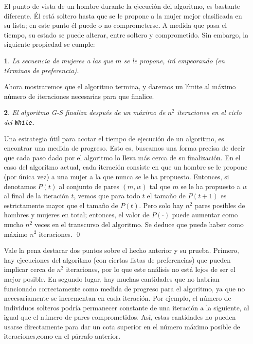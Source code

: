 \documentclass[a4paper, 12pt]{book}
\theoremstyle{dotless}
\newtheorem{theorem}{}[section]
\renewenvironment{proof}{\vspace{12pt}{\noindent\bfseries Demostración.}}{\qed\vspace{12pt}}
\begin{document}
El punto de vista de un hombre durante la ejecución del algoritmo, es bastante diferente. Él está soltero hasta que se le propone a la mujer mejor clasificada en su lista; en este punto él puede o no comprometerse. A medida que pasa el tiempo, su estado se puede alterar, entre soltero y comprometido. Sin embargo, la siguiente propiedad se cumple:
\vspace{0.2cm}

\begin{theorem}
La secuencia de mujeres a las que $m$ se le propone, irá empeorando (en términos de preferencia).
\end{theorem}
 
\vspace{0.2cm}

Ahora mostraremos que el algoritmo termina, y daremos un límite al máximo número de iteraciones necesarias para que finalice.

\vspace{0.2cm}

\noindent\colorbox{mygray}{\parbox{\textwidth}{
\begin{theorem}
El algoritmo G-S finaliza después de un máximo de $n^2$ iteraciones en el ciclo del \texttt{While}.
\end{theorem}
}}

\vspace{0.2cm}

\begin{proof}
Una estrategia útil para acotar el tiempo de ejecución de un algoritmo, es encontrar una medida de progreso. Esto es, buscamos una forma precisa de decir que cada paso dado por el algoritmo lo lleva más cerca de su finalización. En el caso del algoritmo actual, cada iteración consiste en que un hombre se le propone (por única vez) a una mujer a la que nunca se le ha propuesto. Entonces, si denotamos $P(t)$ al conjunto de pares $(m, w)$ tal que $m$ se le ha propuesto a $w$ al final de la iteración $t$, vemos que para todo $t$ el tamaño de $P(t+1)$ es estrictamente mayor que el tamaño de $P(t)$. Pero solo hay $n^2$ pares posibles de hombres y mujeres en total; entonces, el valor de $P(\cdot)$ puede aumentar como mucho $n^2$ veces en el transcurso del algoritmo. Se deduce que puede haber como máximo $n^2$ iteraciones. 
\end{proof} 

Vale la pena destacar dos puntos sobre el hecho anterior y su prueba. Primero, hay ejecuciones del algoritmo (con ciertas listas de preferencias) que pueden implicar cerca de $n^2$ iteraciones, por lo que este análisis no está lejos de ser el mejor posible.
En segundo lugar, hay muchas cantidades que no habrían funcionado correctamente como medida de progreso para el algoritmo, ya que no necesariamente se incrementan en cada iteración. Por ejemplo, el número de individuos solteros podría permanecer constante de una iteración a la siguiente, al igual que el número de pares comprometidos. Así, estas cantidades no pueden usarse directamente para dar un cota superior en el número máximo posible de iteraciones,como en el párrafo anterior.
\end{document}
